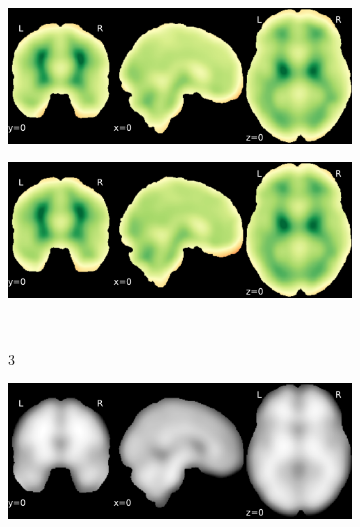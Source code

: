 \documentclass{article}
\begin{document}
\begin{appendices}
\begin{landscape}
\begin{figure}
\begin{subfigure}[t]{0.2\paperheight}
            \end{subfigure}
            \begin{subfigure}[t]{0.2\paperheight}
                \centering
                \includegraphics[width=\textwidth]{figures/sig/20mm/rs_ds001771_sub-36_sig.pdf}
            \end{subfigure}
            \begin{subfigure}[t]{0.2\paperheight}
                \centering
                \includegraphics[width=\textwidth]{figures/sig/20mm/rr.rs_ds001771_sub-36_sig.pdf}
            \end{subfigure} \\
            \begin{subfigure}[b][][c]{0.01\paperwidth} 3 \vspace*{15pt} \end{subfigure}
            \begin{subfigure}[t]{0.2\paperheight}
                \centering
                \includegraphics[width=\textwidth]{figures/sig/20mm/ieee_ds000256_sub-CTS201.pdf}

\end{subfigure}
\end{figure}
\end{landscape}
\end{appendices}
\end{document}
